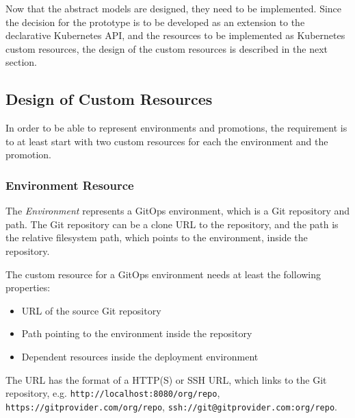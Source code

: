Now that the abstract models are designed,
they need to be implemented.
Since the decision for the prototype is to be developed
as an extension to the declarative Kubernetes API,
and the resources to be implemented as Kubernetes custom resources,
the design of the custom resources is described in the next section.




\newpage

\subsection{Design of Custom Resources}
\label{prototype:design:design-custom-resources}

In order to be able to represent environments and promotions,
the requirement is to at least start with two custom resources for each 
the environment and the promotion.

\subsubsection*{Environment Resource}

The \textit{Environment} represents a GitOps environment,
which is a Git repository and path.
The Git repository can be a clone URL to the repository,
and the path is the relative filesystem path, which points to the 
environment, inside the repository.


The custom resource for a GitOps environment needs at least the following properties:

\begin{itemize}
	\item URL of the source Git repository
	\item Path pointing to the environment inside the repository
	\item Dependent resources inside the deployment environment
\end{itemize}

The URL has the format of a HTTP(S) or SSH URL,
which links to the Git repository, e.g.
\lstinline|http://localhost:8080/org/repo|,
\lstinline|https://gitprovider.com/org/repo|,
\lstinline|ssh://git@gitprovider.com:org/repo|.

